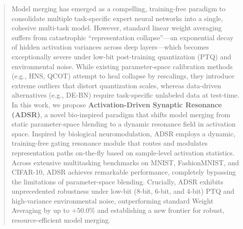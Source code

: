 \documentclass{article}
\theoremstyle{plain}
\theoremstyle{definition}
\theoremstyle{remark}
\begin{document}

\printAffiliationsAndNotice{}

\begin{abstract}
Model merging has emerged as a compelling, training-free paradigm to consolidate multiple task-specific expert neural networks into a single, cohesive multi-task model. However, standard linear weight averaging suffers from catastrophic ``representation collapse''—an exponential decay of hidden activation variances across deep layers—which becomes exceptionally severe under low-bit post-training quantization (PTQ) and environmental noise. While existing parameter-space calibration methods (e.g., HNS, QCOT) attempt to heal collapse by rescalings, they introduce extreme outliers that distort quantization scales, whereas data-driven alternatives (e.g., DE-BN) require task-specific unlabeled data at test-time. In this work, we propose \textbf{Activation-Driven Synaptic Resonance (ADSR)}, a novel bio-inspired paradigm that shifts model merging from static parameter-space blending to a dynamic resonance field in activation space. Inspired by biological neuromodulation, ADSR employs a dynamic, training-free gating resonance module that routes and modulates representation paths on-the-fly based on sample-level activation statistics. Across extensive multitasking benchmarks on MNIST, FashionMNIST, and CIFAR-10, ADSR achieves remarkable performance, completely bypassing the limitations of parameter-space blending. Crucially, ADSR exhibits unprecedented robustness under low-bit (8-bit, 6-bit, and 4-bit) PTQ and high-variance environmental noise, outperforming standard Weight Averaging by up to $+50.0\%$ and establishing a new frontier for robust, resource-efficient model merging.
\end{abstract}
\end{document}
